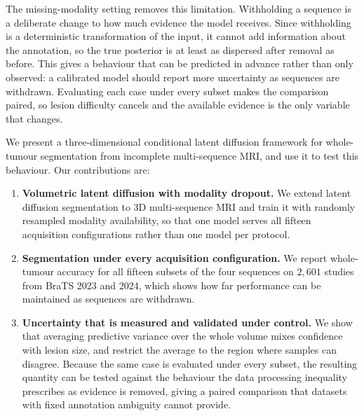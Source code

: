 The missing-modality setting removes this limitation. Withholding a sequence
is a deliberate change to how much evidence the model receives. Since
withholding is a deterministic transformation of the input, it cannot add
information about the annotation, so the true posterior is at least as
dispersed after removal as before. This gives a behaviour that can be
predicted in advance rather than only observed: a calibrated model should
report more uncertainty as sequences are withdrawn. Evaluating each case under
every subset makes the comparison paired, so lesion difficulty cancels and the
available evidence is the only variable that changes.

We present a three-dimensional conditional latent diffusion framework for
whole-tumour segmentation from incomplete multi-sequence MRI, and use it to
test this behaviour. Our contributions are:

\begin{enumerate}
    \item \textbf{Volumetric latent diffusion with modality dropout.} We
    extend latent diffusion segmentation to 3D multi-sequence MRI and train it
    with randomly resampled modality availability, so that one model serves
    all fifteen acquisition configurations rather than one model per protocol.

    \item \textbf{Segmentation under every acquisition configuration.} We
    report whole-tumour accuracy for all fifteen subsets of the four sequences
    on $2{,}601$ studies from BraTS 2023 and 2024, which shows how far
    performance can be maintained as sequences are withdrawn.

    \item \textbf{Uncertainty that is measured and validated under control.}
    We show that averaging predictive variance over the whole volume mixes
    confidence with lesion size, and restrict the average to the region where
    samples can disagree. Because the same case is evaluated under every
    subset, the resulting quantity can be tested against the behaviour the
    data processing inequality prescribes as evidence is removed, giving a
    paired comparison that datasets with fixed annotation ambiguity cannot
    provide.
\end{enumerate}
